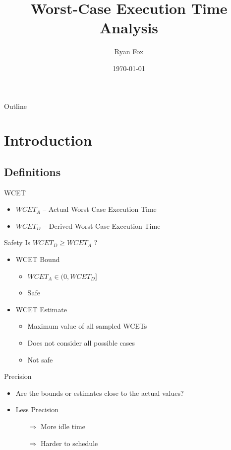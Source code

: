 \documentclass{beamer}
\title{Worst-Case Execution Time Analysis}
\author{Ryan Fox}
\institute
{
  Department of Electrical and Computer Engineering\\
  University of Waterloo
}
\date{\today}
\begin{document}
\begin{frame}
  \titlepage
\end{frame}

\begin{frame}{Outline}
  \tableofcontents[pausesections]
\end{frame}

\section{Introduction}
\subsection{Definitions}

\begin{frame}{WCET}
  \begin{itemize}
    \item $WCET_A$ -- Actual Worst Case Execution Time
    \item $WCET_D$ -- Derived Worst Case Execution Time
  \end{itemize}
\end{frame}

\begin{frame}{Safety}
  Is $WCET_D \geq WCET_A$ ?
  \begin{itemize}
    \item WCET Bound
      \begin{itemize}
        \item $WCET_A \in (0, WCET_D]$
        \item Safe
      \end{itemize}      
      \pause
    \item WCET Estimate
      \begin{itemize}
        \item Maximum value of all sampled WCETs
        \item Does not consider all possible cases
        \item Not safe          
      \end{itemize}      
  \end{itemize}
\end{frame}

\begin{frame}{Precision}
  \begin{itemize}
    \item Are the bounds or estimates close to the actual values? \\
      \pause
    \item Less Precision
      \begin{itemize}
      \item[$\Rightarrow$] More idle time
        \pause
      \item[$\Rightarrow$] Harder to schedule
      \end{itemize}
  \end{itemize}
\end{frame}
\end{document}
